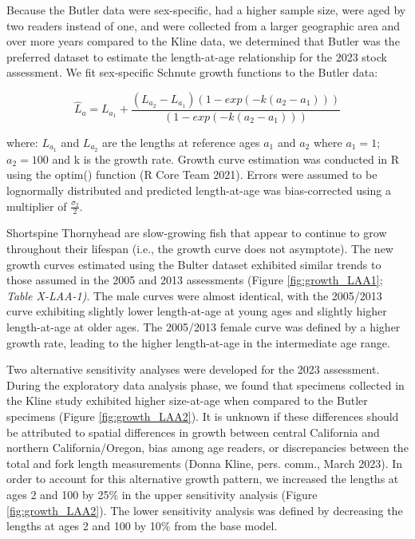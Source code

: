 \documentclass[11pt,
  english,
  letterpaper,
]{article}
\begin{document}
Because the Butler data were sex-specific, had a higher sample size, were aged by two readers instead of one, and were collected from a larger geographic area and over more years compared to the Kline data, we determined that Butler was the preferred dataset to estimate the length-at-age relationship for the 2023 stock assessment. We fit sex-specific Schnute growth functions to the Butler data:

\begin{equation} \hat{L}_{a} = L_{a_{1}}+\frac{(L_{a_{2}}-L_{a_{1}})(1-exp(-k(a_{2}-a_{1})))}{(1-exp(-k(a_{2}-a_{1})))}\end{equation}

where: \(L_{a_{1}}\) and \(L_{a_{2}}\) are the lengths at reference ages \(a_{1}\) and \(a_{2}\) where \(a_{1}=1\);\(a_{2}=100\) and k is the growth rate. Growth curve estimation was conducted in R using the optim() function (R Core Team 2021). Errors were assumed to be lognormally distributed and predicted length-at-age was bias-corrected using a multiplier of \(\frac{\sigma_2}{2}\).

Shortspine Thornyhead are slow-growing fish that appear to continue to grow throughout their lifespan (i.e., the growth curve does not asymptote). The new growth curves estimated using the Bulter dataset exhibited similar trends to those assumed in the 2005 and 2013 assessments (Figure \ref{fig:growth_LAA1}; \emph{\emph{Table X-LAA-1)}}. The male curves were almost identical, with the 2005/2013 curve exhibiting slightly lower length-at-age at young ages and slightly higher length-at-age at older ages. The 2005/2013 female curve was defined by a higher growth rate, leading to the higher length-at-age in the intermediate age range.

Two alternative sensitivity analyses were developed for the 2023 assessment. During the exploratory data analysis phase, we found that specimens collected in the Kline study exhibited higher size-at-age when compared to the Butler specimens (Figure \ref{fig:growth_LAA2}). It is unknown if these differences should be attributed to spatial differences in growth between central California and northern California/Oregon, bias among age readers, or discrepancies between the total and fork length measurements (Donna Kline, pers. comm., March 2023). In order to account for this alternative growth pattern, we increased the lengths at ages 2 and 100 by 25\% in the upper sensitivity analysis (Figure \ref{fig:growth_LAA2}). The lower sensitivity analysis was defined by decreasing the lengths at ages 2 and 100 by 10\% from the base model.
\end{document}
